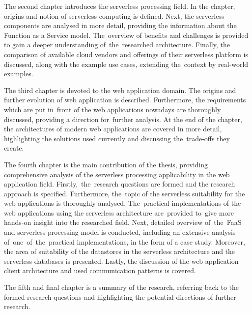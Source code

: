 The second chapter introduces the serverless processing field.
In the chapter, origins and notion of serverless computing is defined.
Next, the serverless components are analysed in more detail, providing the information about the Function as a Service model.
The~overview of benefits and challenges is provided to gain a deeper understanding of~the~researched architecture.
Finally, the comparison of available cloud vendors and offerings of their serverless platform is discussed, along with the example use cases, extending the~context by real-world examples.

The third chapter is devoted to the web application domain. The origins and further evolution of web application is described.
Furthermore, the requirements which are put in~front of the web applications nowadays are thoroughly discussed, providing a direction for~further analysis.
At the end of the chapter, the architectures of modern web applications are covered in more detail, highlighting the solutions used currently and discussing the~trade-offs they create.

The fourth chapter is the main contribution of the thesis, providing comprehensive analysis of the serverless processing applicability in the web application field.
Firstly,~the~research questions are formed and the research approach is specified.
Furthermore, the~topic of the serverless suitability for the web applications is thoroughly analysed.
The~practical implementations of the web applications using the serverless architecture are~provided to~give more hands-on insight into the researched field.
Next, detailed overview of~the~FaaS and serverless processing model is conducted, including an extensive analysis of~one~of~the~practical implementations, in the form of a case study.
Moreover, the area of suitability of the datastores in the serverless architecture and the serverless databases is presented.
Lastly, the discussion of the web application client architecture and used communication patterns is covered.

The fifth and final chapter is a summary of the research, referring back to the formed research questions and highlighting the potential directions of further research.

